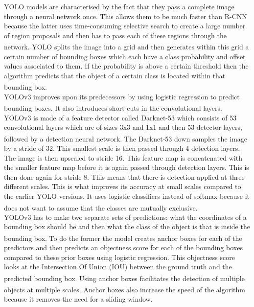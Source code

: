 \documentclass[11pt]{article}		%
\newcommand{\supercite}[1]{\textsuperscript{\cite{#1}}}		%
\begin{document}
	        YOLO models are characterised by the fact that they pass a complete image through a neural network once. This allows them to be much faster than R-CNN because the latter uses time-consuming selective search to create a large number of region proposals and then has to pass each of these regions through the network.\supercite{YOLO2} \supercite{R-CNN} YOLO splits the image into a grid and then generates within this grid a certain number of bounding boxes which each have a class probability and offset values associated to them. If the probability is above a certain threshold then the algorithm predicts that the object of a certain class is located within that bounding box.\supercite{Object_detection} 
	        \\
	        YOLOv3 improves upon its predecessors by using logistic regression to predict bounding boxes.\supercite{YOLOV3} It also introduces short-cuts in the convolutional layers.
	        YOLOv3 is made of a feature detector called Darknet-53 which consists of 53 convolutional layers which are of sizes 3x3 and 1x1 and then 53 detector layers, followed by a detection neural network. \supercite{YOLOV3}
	        The Darknet-53 down samples the image by a stride of 32. This smallest scale is then passed through 4 detection layers. The image is then upscaled to stride 16. This feature map is concatenated with the smaller feature map before it is again passed through detection layers. This is then done again for stride 8. This means that there is detection applied at three different scales. This is what improves its accuracy at small scales compared to the earlier YOLO versions. It uses logistic classifiers instead of softmax because it does not want to assume that the classes are mutually exclusive.\supercite{YOLOV3} 
	        \\
	        YOLOv3 has to make two separate sets of predictions: what the coordinates of a bounding box should be and then what the class of the object is that is inside the bounding box.\supercite{YOLOV3} To do the former the model creates anchor boxes for each of the predictors and then predicts an objectness score for each of the bounding boxes compared to these prior boxes using logistic regression. This objectness score looks at the Intersection Of Union (IOU) between the ground truth and the predicted bounding box.\supercite{YOLOV2}\supercite{YOLOV3} Using anchor boxes facilitates the detection of multiple objects at multiple scales.\supercite{Anchor_Boxes} Anchor boxes also increase the speed of the algorithm because it removes the need for a sliding window. 
\end{document}
